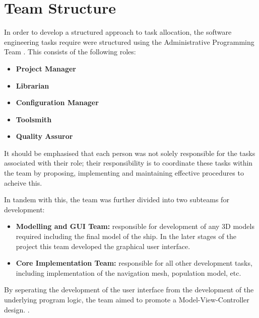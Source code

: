 %

\section{Team Structure}
\label{Team:subsec:structure}
In order to develop a structured approach to task allocation, the software engineering tasks require were structured using the Administrative Programming Team \cite{AdministrativeProgrammingTeam}. This consists of the following roles:
\begin{itemize}
\item{\textbf{Project Manager} }
\item{\textbf{Librarian} }
\item{\textbf{Configuration Manager} }
\item{\textbf{Toolsmith} }
\item{\textbf{Quality Assuror}}
\end{itemize}

It should be emphasised that each person was not solely responsible for the tasks associated with their role; their responsibility is to coordinate these tasks within the team by proposing, implementing and maintaining effective procedures to acheive this.

In tandem with this, the team was further divided into two subteams for development:
\begin{itemize}
\item \textbf{Modelling and GUI Team:} responsible for development of any 3D models required including the final model of the ship. In the later stages of the project this team developed the graphical user interface.
\item \textbf{Core Implementation Team:} responsible for all other development tasks, including implementation of the navigation mesh, population model, etc.
\end{itemize}

By seperating the development of the user interface from the development of the underlying program logic, the team aimed to promote a Model-View-Controller design. \cite[Ch 6.3.1]{SommervilleSoftwareEng}.
  
